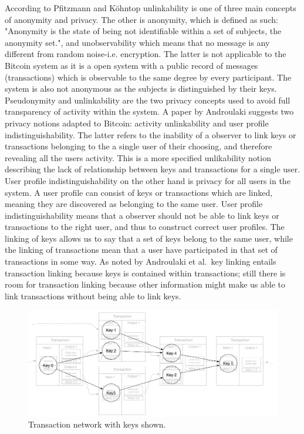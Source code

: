 According to Pfitzmann and Köhntop unlinkability is one of three main concepts of anonymity and privacy. The other is anonymity, which is defined as such: "Anonymity is the state of being not identifiable within a set of subjects, the anonymity set."\cite{pfitzmann2001anonymity}, and unobservability which means that no message is any different from random noise-i.e. encryption. The latter is not applicable to the Bitcoin system as it is a open system with a public record of messages (transactions) which is observable to the same degree by every participant. The system is also not anonymous as the subjects is distinguished by their keys.
\\

Pseudonymity and unlinkability are the two privacy concepts used to avoid full transparency of activity within the system. A paper by Androulaki \cite{androulaki2013evaluating} suggests two privacy notions adapted to Bitcoin: activity unlinkability and user profile indistinguishability. The latter refers to the inability of a observer to link keys or transactions belonging to the a single user of their choosing, and therefore revealing all the users activity. This is a more specified unlikability notion describing the lack of relationship between keys and transactions for a single user. User profile indistinguishability on the other hand is privacy for all users in the system. A user profile can consist of keys or transactions which are linked, meaning they are discovered as belonging to the same user. User profile indistinguishability means that a observer should not be able to link keys or transactions to the right user, and thus to construct correct user profiles. The linking of keys allows us to say that a set of keys belong to the same user, while the linking of transactions mean that a user have participated in that set of transactions in some way. As noted by Androulaki et al.~key linking entails transaction linking because keys is contained within transactions; still there is room for transaction linking because other information might make us able to link transactions without being able to link keys. 

\begin{figure}[ht]
    \centering
    \includegraphics[width=14cm]{figures/key_network_related.png}
    \caption{ Transaction network with keys shown.}
    \label{fig:transaction_graph_keys}
\end{figure}

